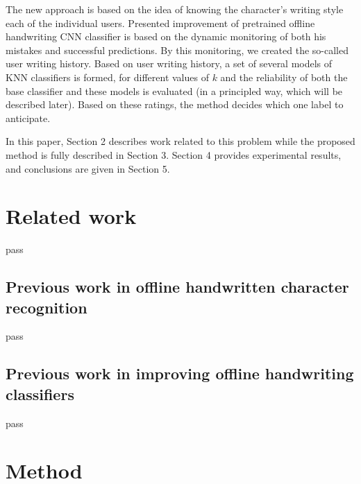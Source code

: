 \documentclass{article}
\begin{document}

The new approach is based on the idea of knowing the character's writing style each of the individual users. 
Presented improvement of pretrained offline handwriting CNN classifier is based on the dynamic monitoring of both his mistakes and successful predictions. 
By this monitoring, we created the so-called user writing history. 
Based on user writing history, a set of several models of KNN classifiers is formed, for different values of $k$ and the reliability of both the base classifier and these models is evaluated (in a principled way, which will be described later). 
Based on these ratings, the method decides which one label to anticipate. 

In this paper, Section 2 describes work related to this problem while the proposed method is fully described in Section 3.
Section 4 provides experimental results, and conclusions are given in Section 5.

\section{Related work}
pass 

\subsection{Previous work in offline handwritten character recognition}
pass

\subsection{Previous work in improving offline handwriting classifiers}
pass

\section{Method}
\end{document}
